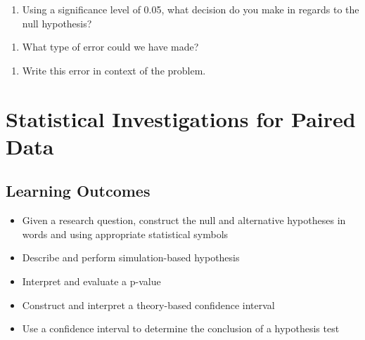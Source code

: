 \documentclass[
]{report}
\providecommand{\tightlist}{%
  \setlength{\itemsep}{0pt}\setlength{\parskip}{0pt}}
\begin{document}
\begin{enumerate}
\def\labelenumi{\arabic{enumi}.}
\setcounter{enumi}{25}
\tightlist
\item
  Using a significance level of 0.05, what decision do you make in regards to the null hypothesis?
\end{enumerate}

\vspace{0.5in}

\begin{enumerate}
\def\labelenumi{\arabic{enumi}.}
\setcounter{enumi}{26}
\tightlist
\item
  What type of error could we have made?
\end{enumerate}

\vspace{0.5in}

\begin{enumerate}
\def\labelenumi{\arabic{enumi}.}
\setcounter{enumi}{27}
\tightlist
\item
  Write this error in context of the problem.
\end{enumerate}

\vspace{1in}

\hypertarget{statistical-investigations-for-paired-data}{%
\chapter{Statistical Investigations for Paired Data}\label{statistical-investigations-for-paired-data}}

\hypertarget{learning-outcomes}{%
\section{Learning Outcomes}\label{learning-outcomes}}

\begin{itemize}
\item
  Given a research question, construct the null and alternative hypotheses
  in words and using appropriate statistical symbols
\item
  Describe and perform simulation-based hypothesis
\item
  Interpret and evaluate a p-value
\item
  Construct and interpret a theory-based confidence interval
\item
  Use a confidence interval to determine the conclusion of a hypothesis test
\end{itemize}
\end{document}
